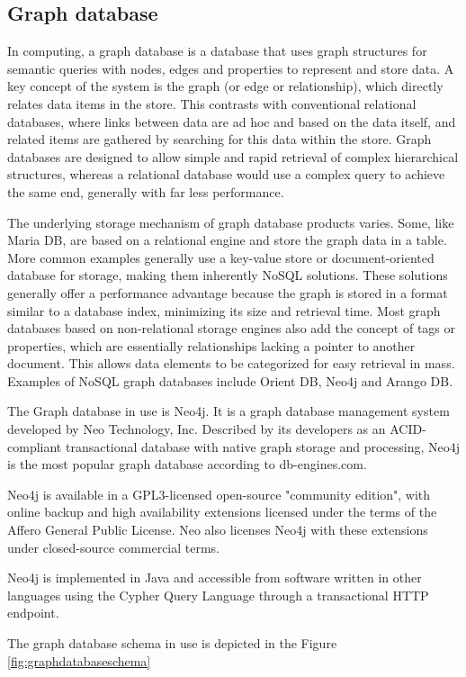 \subsection{Graph database}
\par 
In computing, a graph database is a database that uses graph structures for semantic queries with nodes, edges and properties to represent and store data. A key concept of the system is the graph (or edge or relationship), which directly relates data items in the store. This contrasts with conventional relational databases, where links between data are ad hoc and based on the data itself, and related items are gathered by searching for this data within the store. Graph databases are designed to allow simple and rapid retrieval of complex hierarchical structures, whereas a relational database would use a complex query to achieve the same end, generally with far less performance.\cite{graphvisualiztion}
\par The underlying storage mechanism of graph database products varies. Some, like Maria DB, are based on a relational engine and store the graph data in a table. More common examples generally use a key-value store or document-oriented database for storage, making them inherently NoSQL solutions. These solutions generally offer a performance advantage because the graph is stored in a format similar to a database index, minimizing its size and retrieval time. Most graph databases based on non-relational storage engines also add the concept of tags or properties, which are essentially relationships lacking a pointer to another document. This allows data elements to be categorized for easy retrieval in mass. Examples of NoSQL graph databases include Orient DB, Neo4j and Arango DB.
\par The Graph database in use is Neo4j. It is a graph database management system developed by Neo Technology, Inc. Described by its developers as an ACID-compliant transactional database with native graph storage and processing, Neo4j is the most popular graph database according to db-engines.com.
\par Neo4j is available in a GPL3-licensed open-source "community edition", with online backup and high availability extensions licensed under the terms of the Affero General Public License. Neo also licenses Neo4j with these extensions under closed-source commercial terms.
\par Neo4j is implemented in Java and accessible from software written in other languages using the Cypher Query Language through a transactional HTTP endpoint.
 \par The graph database schema in use is depicted in the Figure \ref{fig:graphdatabaseschema}

